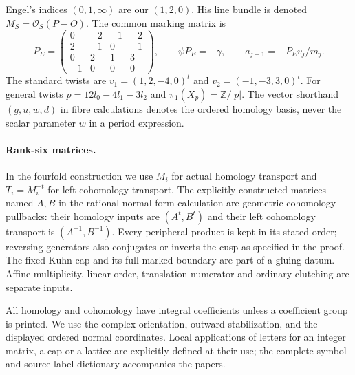 Engel's indices $(0,1,\infty)$ are our $(1,2,0)$.
His line bundle is denoted $M_S=\mathcal O_S(P-O)$.
The common marking matrix is
\[
P_E=\begin{pmatrix}0&-2&-1&-2\\2&-1&0&-1\\0&2&1&3\\-1&0&0&0\end{pmatrix},
\qquad \psi P_E=-\gamma,\qquad a_{j-1}=-P_Ev_j/m_j.
\]
The standard twists are $v_1=(1,2,-4,0)^t$ and
$v_2=(-1,-3,3,0)^t$. For general twists
$p=12l_0-4l_1-3l_2$ and $\pi_1(X_p)=\mathbb Z/|p|$.
The vector shorthand $(g,u,w,d)$ in fibre calculations denotes the ordered
homology basis, never the scalar parameter $w$ in a period expression.

\paragraph{Rank-six matrices.}
In the fourfold construction we use $M_i$ for actual homology transport
and $T_i=M_i^{-t}$ for left cohomology transport. The explicitly constructed
matrices named $A,B$ in the rational normal-form calculation are geometric
cohomology pullbacks: their homology inputs are $(A^t,B^t)$ and their left
cohomology transport is $(A^{-1},B^{-1})$. Every peripheral product is kept
in its stated order; reversing generators also conjugates or inverts the
cusp as specified in the proof. The fixed Kuhn cap and its full marked
boundary are part of a gluing datum. Affine multiplicity, linear order,
translation numerator and ordinary clutching are separate inputs.

All homology and cohomology have integral coefficients unless a coefficient
group is printed. We use the complex orientation, outward stabilization,
and the displayed ordered normal coordinates. Local applications of letters
for an integer matrix, a cap or a lattice are explicitly defined at their
use; the complete symbol and source-label dictionary accompanies the papers.
